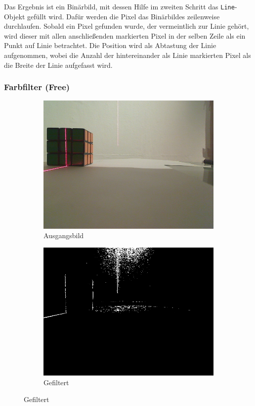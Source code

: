 \documentclass[ngerman,a4paper,parskip=half]{scrartcl}
\begin{document}
Das Ergebnis ist ein Binärbild, mit dessen Hilfe im zweiten Schritt das \texttt{Line}-Objekt gefüllt wird. Dafür werden die Pixel das Binärbildes zeilenweise durchlaufen. Sobald ein Pixel gefunden wurde, der vermeintlich zur Linie gehört, wird dieser mit allen anschließenden markierten Pixel in der selben Zeile als ein Punkt auf Linie betrachtet. Die Position wird als Abtastung der Linie aufgenommen, wobei die Anzahl der hintereinander als Linie markierten Pixel als die Breite der Linie aufgefasst wird.

\subsubsection{Farbfilter (Free)}

\begin{figure}
	\centering

	\begin{subfigure}{0.45\textwidth}
		\includegraphics[width=\textwidth]{includes/line_line.png}
		\caption{Ausgangsbild}
	\end{subfigure}
	\hfill
	\begin{subfigure}{0.45\textwidth}
		\includegraphics[width=\textwidth]{includes/line_free.png}
		\caption{Gefiltert}
	\end{subfigure}


\end{figure}
\end{document}

